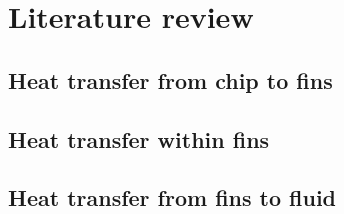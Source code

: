 \documentclass[../main.tex]{subfiles}
\begin{document}
\section{Literature review}

\blindtext

\subsection{Heat transfer from chip to fins}
\blindtext {}

\subsection{Heat transfer within fins}
\blindtext

\subsection{Heat transfer from fins to fluid}
\blindtext
{}
\end{document}
